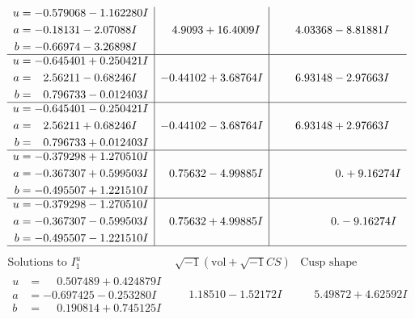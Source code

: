 \documentclass[1p]{elsarticle_modified}
\theoremstyle{definition}
\newcommand{\I}{\sqrt{-1}}
\begin{document}
$$\begin{array}{c|c|c}
\begin{aligned}
u &= -0.579068 - 1.162280 I \\
a &= -0.18131 - 2.07088 I \\
b &= -0.66974 - 3.26898 I\end{aligned}
 & \phantom{-}4.9093 + 16.4009 I & \phantom{-}4.03368 - 8.81881 I \\ \hline\begin{aligned}
u &= -0.645401 + 0.250421 I \\
a &= \phantom{-}2.56211 - 0.68246 I \\
b &= \phantom{-}0.796733 - 0.012403 I\end{aligned}
 & -0.44102 + 3.68764 I & \phantom{-}6.93148 - 2.97663 I \\ \hline\begin{aligned}
u &= -0.645401 - 0.250421 I \\
a &= \phantom{-}2.56211 + 0.68246 I \\
b &= \phantom{-}0.796733 + 0.012403 I\end{aligned}
 & -0.44102 - 3.68764 I & \phantom{-}6.93148 + 2.97663 I \\ \hline\begin{aligned}
u &= -0.379298 + 1.270510 I \\
a &= -0.367307 + 0.599503 I \\
b &= -0.495507 + 1.221510 I\end{aligned}
 & \phantom{-}0.75632 - 4.99885 I & \phantom{-0.000000 -}0. + 9.16274 I \\ \hline\begin{aligned}
u &= -0.379298 - 1.270510 I \\
a &= -0.367307 - 0.599503 I \\
b &= -0.495507 - 1.221510 I\end{aligned}
 & \phantom{-}0.75632 + 4.99885 I & \phantom{-0.000000 } 0. - 9.16274 I\\
 \hline 
 \end{array}$$\newpage$$\begin{array}{c|c|c}  
\text{Solutions to }I^u_{1}& \I (\text{vol} + \sqrt{-1}CS) & \text{Cusp shape}\\
 \hline 
\begin{aligned}
u &= \phantom{-}0.507489 + 0.424879 I \\
a &= -0.697425 - 0.253280 I \\
b &= \phantom{-}0.190814 + 0.745125 I\end{aligned}
 & \phantom{-}1.18510 - 1.52172 I & \phantom{-}5.49872 + 4.62592 I \\ \hline\begin{aligned}

\end{aligned}
\end{array}$$
\end{document}
